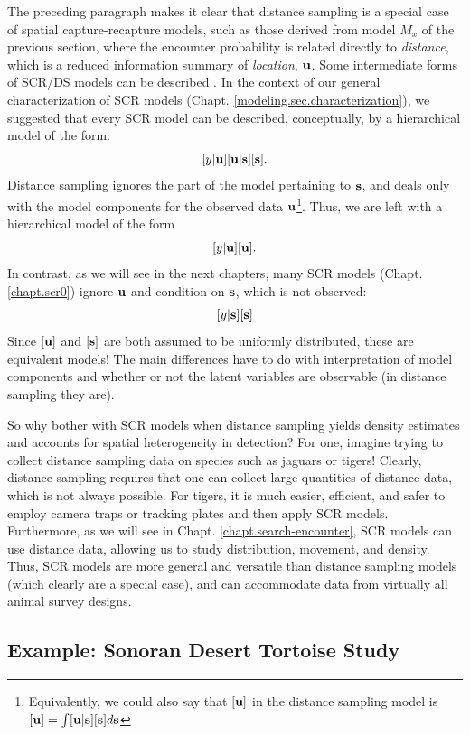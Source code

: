 The preceding paragraph makes it clear that distance sampling is a
special case of spatial capture-recapture models, such as those
derived from model $M_{x}$ of the previous section, where the
encounter probability is related directly to {\it distance}, which is
a reduced information summary of {\it location}, ${\bf u}$.  Some
intermediate forms of SCR/DS models can be described
\citep{royle_etal:2011mee}.  In the context of our general
characterization of SCR models
(Chapt. \ref{modeling.sec.characterization}), we suggested that every
SCR model can be described, conceptually, by a hierarchical model of
the form:
\[
 [y|{\bf u}][{\bf u}|{\bf s}][{\bf s}].
\]
Distance sampling ignores the part of the model pertaining to ${\bf
  s}$, and deals only with the model components for the observed
data  ${\bf u}$\footnote{Equivalently, we could also say that $[{\bf u}]$ in
  the distance sampling model is $[{\bf u}] = \int [{\bf u}|{\bf s}][{\bf s}]
  d{\bf s}$}. Thus, we are left with a hierarchical model of the form
\[
[y|{\bf u}][{\bf u}].
\]
In contrast, as we will see in the next chapters, many  SCR models
(Chapt. \ref{chapt.scr0}) ignore ${\bf u}$ and condition on ${\bf s}$,
which is not observed:
\[
[y|{\bf s}][{\bf s}]
\]
Since $[{\bf u}]$ and $[{\bf s}]$ are both assumed to be uniformly
distributed, these are equivalent models! The main differences have to
do with interpretation of model components and whether or not the
latent variables are observable (in distance sampling they are).

So why bother with SCR models when distance sampling yields density
estimates and accounts for spatial heterogeneity in detection? For
one, imagine trying to collect distance sampling data on species such
as jaguars or tigers!  Clearly, distance sampling requires that one
can collect large quantities of distance data, which is not always
possible. For tigers, it is much easier, efficient, and safer to
employ camera traps or tracking plates and then apply SCR
models. Furthermore, as we will see in Chapt.
\ref{chapt.search-encounter}, SCR models can use distance data,
allowing us to study distribution, movement, and density. Thus, SCR
models are more general and versatile than distance sampling models
(which clearly are a special case), and can accommodate data from
virtually all animal survey designs.

\subsection{Example: Sonoran Desert Tortoise Study}

